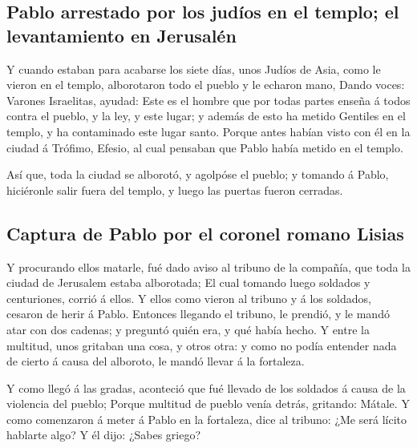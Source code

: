 \hypertarget{pablo-arrestado-por-los-juduxedos-en-el-templo-el-levantamiento-en-jerusaluxe9n}{%
\subsection{Pablo arrestado por los judíos en el templo; el
levantamiento en
Jerusalén}\label{pablo-arrestado-por-los-juduxedos-en-el-templo-el-levantamiento-en-jerusaluxe9n}}

 Y cuando estaban para acabarse los siete días, unos Judíos
de Asia, como le vieron en el templo, alborotaron todo el pueblo y le
echaron mano,  Dando voces: Varones Israelitas, ayudad:
Este es el hombre que por todas partes enseña á todos contra el pueblo,
y la ley, y este lugar; y además de esto ha metido Gentiles en el
templo, y ha contaminado este lugar santo.  Porque antes
habían visto con él en la ciudad á Trófimo, Efesio, al cual pensaban que
Pablo había metido en el templo.

 Así que, toda la ciudad se alborotó, y agolpóse el pueblo;
y tomando á Pablo, hiciéronle salir fuera del templo, y luego las
puertas fueron cerradas.

\hypertarget{captura-de-pablo-por-el-coronel-romano-lisias}{%
\subsection{Captura de Pablo por el coronel romano
Lisias}\label{captura-de-pablo-por-el-coronel-romano-lisias}}

 Y procurando ellos matarle, fué dado aviso al tribuno de
la compañía, que toda la ciudad de Jerusalem estaba alborotada;
 El cual tomando luego soldados y centuriones, corrió á
ellos. Y ellos como vieron al tribuno y á los soldados, cesaron de herir
á Pablo.  Entonces llegando el tribuno, le prendió, y le
mandó atar con dos cadenas; y preguntó quién era, y qué había hecho.
 Y entre la multitud, unos gritaban una cosa, y otros otra:
y como no podía entender nada de cierto á causa del alboroto, le mandó
llevar á la fortaleza.

 Y como llegó á las gradas, aconteció que fué llevado de
los soldados á causa de la violencia del pueblo;  Porque
multitud de pueblo venía detrás, gritando: Mátale.  Y como
comenzaron á meter á Pablo en la fortaleza, dice al tribuno: ¿Me será
lícito hablarte algo? Y él dijo: ¿Sabes griego?

